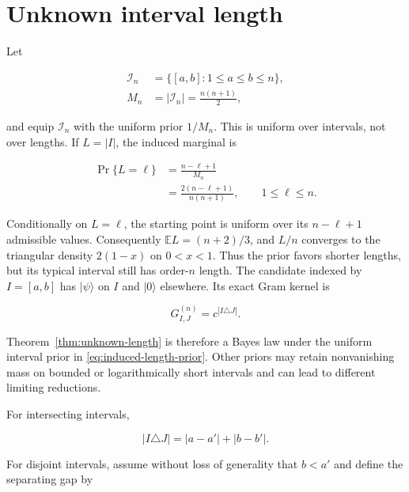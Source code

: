 \section{Unknown interval length}\label{unknown-interval-length}

Let

\begin{align*}
\mathcal I_n&=\{[a,b]:1\le a\le b\le n\}, \\
M_n&=|\mathcal I_n|=\frac{n(n+1)}2,
\end{align*}

and equip \(\mathcal I_n\) with the uniform prior \(1/M_n\). This is uniform
over intervals, not over lengths. If \(L=|I|\), the induced marginal is

\begin{equation}\label{eq:induced-length-prior}
\begin{aligned}
\Pr\{L=\ell\}
&=\frac{n-\ell+1}{M_n}\\
&=\frac{2(n-\ell+1)}{n(n+1)},
\qquad 1\leq\ell\leq n.
\end{aligned}
\end{equation}

Conditionally on \(L=\ell\), the starting point is uniform over its
\(n-\ell+1\) admissible values. Consequently
\(\mathbb E L=(n+2)/3\), and \(L/n\) converges to the triangular density
\(2(1-x)\) on \(0<x<1\). Thus the prior favors shorter lengths, but its
typical interval still has order-\(n\) length. The candidate indexed by
\(I=[a,b]\) has \(|\psi\rangle\) on \(I\) and \(|0\rangle\) elsewhere. Its
exact Gram kernel is

\begin{equation}\label{eq:interval-gram}
G^{(n)}_{I,J}=c^{|I\triangle J|}.
\end{equation}

Theorem~\ref{thm:unknown-length} is therefore a Bayes law under the uniform
interval prior in \eqref{eq:induced-length-prior}. Other priors may retain
nonvanishing mass on bounded or logarithmically short intervals and can lead
to different limiting reductions.

For intersecting intervals,

\begin{equation}\label{eq:intersecting-distance}
|I\triangle J|=|a-a'|+|b-b'|.
\end{equation}

For disjoint intervals, assume without loss of generality that \(b<a'\) and define the separating gap by

